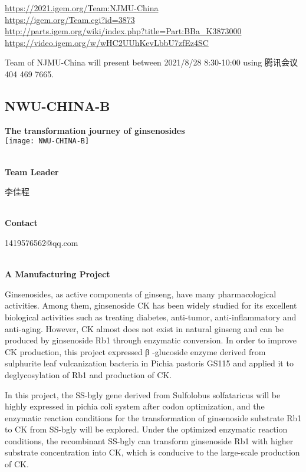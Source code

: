 \url{https://2021.igem.org/Team:NJMU-China }\\
\url{https://igem.org/Team.cgi?id=3873 }\\
\url{http://parts.igem.org/wiki/index.php?title=Part:BBa_K3873000 }\\
\url{https://video.igem.org/w/wHC2UUhKevLbbU7zfEz4SC }\\

\vfill{}









Team of NJMU-China will present between    2021/8/28 8:30-10:00     using 腾讯会议 404 469 7665.
\newpage


\subsection{\textcolor{Blu}{ NWU-CHINA-B } }
\vspace{5mm}
\begin{center}
\large{
  \textbf{ The transformation journey of ginsenosides }\\

  \texttt{[image: NWU-CHINA-B]}
}
\end{center}
\textbf{\\Team Leader}

  李佳程


\textbf{\\Contact}

  1419576562@qq.com


\textbf{\\A Manufacturing Project\\}\begin{spacing}{1.5}

Ginsenosides, as active components of ginseng, have many pharmacological activities. Among them, ginsenoside CK has been widely studied for its excellent biological activities such as treating diabetes, anti-tumor, anti-inflammatory and anti-aging. However, CK almost does not exist in natural ginseng and can be produced by ginsenoside Rb1 through enzymatic conversion. In order to improve CK production, this project expressed β -glucoside enzyme derived from sulphurite leaf vulcanization bacteria in Pichia pastoris GS115 and applied it to deglycosylation of Rb1 and production of CK.

In this project, the SS-bgly gene derived from Sulfolobus solfataricus will be highly expressed in pichia coli system after codon optimization, and the enzymatic reaction conditions for the transformation of ginsenoside substrate Rb1 to CK from SS-bgly will be explored. Under the optimized enzymatic reaction conditions, the recombinant SS-bgly can transform ginsenoside Rb1 with higher substrate concentration into CK, which is conducive to the large-scale production of CK.\end{spacing}
\\


